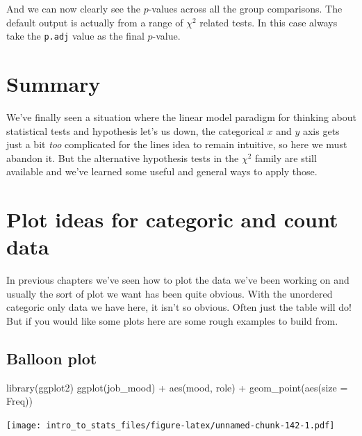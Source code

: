 \documentclass[
]{book}
\newenvironment{Shaded}{\begin{snugshade}}{\end{snugshade}}
\newcommand{\AttributeTok}[1]{\textcolor[rgb]{0.77,0.63,0.00}{#1}}
\newcommand{\FunctionTok}[1]{\textcolor[rgb]{0.00,0.00,0.00}{#1}}
\newcommand{\NormalTok}[1]{#1}
\newcommand{\SpecialCharTok}[1]{\textcolor[rgb]{0.00,0.00,0.00}{#1}}
\begin{document}
And we can now clearly see the \(p\)-values across all the group comparisons. The default output is actually from a range of \(\chi^2\) related tests. In this case always take the \texttt{p.adj} value as the final \(p\)-value.

\hypertarget{summary}{%
\section{Summary}\label{summary}}

We've finally seen a situation where the linear model paradigm for thinking about statistical tests and hypothesis let's us down, the categorical \(x\) and \(y\) axis gets just a bit \emph{too} complicated for the lines idea to remain intuitive, so here we must abandon it. But the alternative hypothesis tests in the \(\chi^2\) family are still available and we've learned some useful and general ways to apply those.

\hypertarget{plot-ideas-for-categoric-and-count-data}{%
\section{Plot ideas for categoric and count data}\label{plot-ideas-for-categoric-and-count-data}}

In previous chapters we've seen how to plot the data we've been working on and usually the sort of plot we want has been quite obvious. With the unordered categoric only data we have here, it isn't so obvious. Often just the table will do! But if you would like some plots here are some rough examples to build from.

\hypertarget{balloon-plot}{%
\subsection{Balloon plot}\label{balloon-plot}}

\begin{Shaded}
\begin{Highlighting}[]
\FunctionTok{library}\NormalTok{(ggplot2)}
\FunctionTok{ggplot}\NormalTok{(job\_mood) }\SpecialCharTok{+} \FunctionTok{aes}\NormalTok{(mood, role) }\SpecialCharTok{+} \FunctionTok{geom\_point}\NormalTok{(}\FunctionTok{aes}\NormalTok{(}\AttributeTok{size =}\NormalTok{ Freq))}
\end{Highlighting}
\end{Shaded}

\texttt{[image: intro\_to\_stats\_files/figure-latex/unnamed-chunk-142-1.pdf]}
\end{document}

